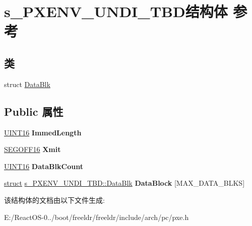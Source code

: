 \hypertarget{structs___p_x_e_n_v___u_n_d_i___t_b_d}{}\section{s\+\_\+\+P\+X\+E\+N\+V\+\_\+\+U\+N\+D\+I\+\_\+\+T\+B\+D结构体 参考}
\label{structs___p_x_e_n_v___u_n_d_i___t_b_d}
\subsection*{类}
\begin{DoxyCompactItemize}
\item 
struct \hyperlink{structs___p_x_e_n_v___u_n_d_i___t_b_d_1_1_data_blk}{Data\+Blk}
\end{DoxyCompactItemize}
\subsection*{Public 属性}
\begin{DoxyCompactItemize}
\item 
\mbox{\label{structs___p_x_e_n_v___u_n_d_i___t_b_d_ac75f36acb4da0b3f7e816e619b1f37d2}} 
\hyperlink{_processor_bind_8h_a09f1a1fb2293e33483cc8d44aefb1eb1}{U\+I\+N\+T16} {\bfseries Immed\+Length}
\item 
\mbox{\label{structs___p_x_e_n_v___u_n_d_i___t_b_d_a926b675c17c0786af3be56df588edff4}} 
\hyperlink{structs___s_e_g_o_f_f16}{S\+E\+G\+O\+F\+F16} {\bfseries Xmit}
\item 
\mbox{\label{structs___p_x_e_n_v___u_n_d_i___t_b_d_ae40a83724e199be6ea8e6450b1d3125f}} 
\hyperlink{_processor_bind_8h_a09f1a1fb2293e33483cc8d44aefb1eb1}{U\+I\+N\+T16} {\bfseries Data\+Blk\+Count}
\item 
\mbox{\label{structs___p_x_e_n_v___u_n_d_i___t_b_d_ac8574d7dc5469885bbecb2b878ede084}} 
\hyperlink{interfacestruct}{struct} \hyperlink{structs___p_x_e_n_v___u_n_d_i___t_b_d_1_1_data_blk}{s\+\_\+\+P\+X\+E\+N\+V\+\_\+\+U\+N\+D\+I\+\_\+\+T\+B\+D\+::\+Data\+Blk} {\bfseries Data\+Block} \mbox{[}M\+A\+X\+\_\+\+D\+A\+T\+A\+\_\+\+B\+L\+KS\mbox{]}
\end{DoxyCompactItemize}


该结构体的文档由以下文件生成\+:\begin{DoxyCompactItemize}
\item 
E\+:/\+React\+O\+S-\/0../boot/freeldr/freeldr/include/arch/pc/pxe.\+h\end{DoxyCompactItemize}
